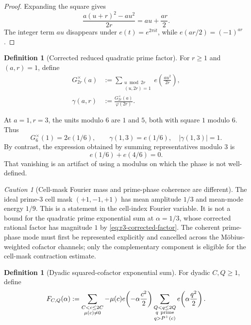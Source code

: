 \documentclass[11pt]{article}
\theoremstyle{definition}
\newtheorem{definition}[theorem]{Definition}
\theoremstyle{remark}
\newtheorem{caution}[theorem]{Caution}
\newcommand{\Pplus}{P^{+}}
\newcommand{\1}{\mathbf{1}}
\begin{document}
\begin{proof}
Expanding the square gives
\[
 \frac{a(u+r)^2-au^2}{2r}=au+\frac{ar}{2}.
\]
The integer term $au$ disappears under $e(t)=e^{2\pi i t}$, while
$e(ar/2)=(-1)^{ar}$.
\end{proof}

\begin{definition}[Corrected reduced quadratic prime factor]
\label{def:corrected-quadratic-factor}
For $r\ge1$ and $(a,r)=1$, define
\begin{align}
 G_{2r}^{\times}(a)
 &:={}
 \sum_{\substack{u\bmod 2r\\(u,2r)=1}}
 e\!\left(\frac{au^2}{2r}\right),
 \label{eq:corrected-reduced-Gauss}\\
 \gamma(a,r)
 &:={}
 \frac{G_{2r}^{\times}(a)}{\varphi(2r)}.
 \label{eq:normalized-corrected-factor}
\end{align}
\end{definition}

At $a=1,r=3$, the units modulo $6$ are $1$ and $5$, both with square $1$
modulo $6$.  Thus
\begin{equation}
 G_{6}^{\times}(1)=2e(1/6),
 \qquad
 \boxed{\gamma(1,3)=e(1/6),\quad |\gamma(1,3)|=1.}
 \label{eq:r3-corrected-factor}
\end{equation}
By contrast, the expression obtained by summing representatives modulo $3$ is
\[
 e(1/6)+e(4/6)=0.
\]
That vanishing is an artifact of using a modulus on which the phase is not
well-defined.

\begin{caution}[Cell-mask Fourier mass and prime-phase coherence are different]
\label{caution:cell-mask-vs-prime-phase}
The ideal prime-$3$ cell mask $(+1,-1,+1)$ has mean amplitude $1/3$ and mean-mode
energy $1/9$.  This is a statement in the cell-index Fourier variable.  It is not a
bound for the quadratic prime exponential sum at $\alpha=1/3$, whose corrected
rational factor has magnitude $1$ by \cref{eq:r3-corrected-factor}.  The coherent
prime-phase mode must first be represented explicitly and cancelled across the
M\"obius-weighted cofactor channels; only the complementary component is eligible
for the cell-mask contraction estimate.
\end{caution}

\begin{definition}[Dyadic squared-cofactor exponential sum]
\label{def:squared-cofactor-sum}
For dyadic $C,Q\ge1$, define
\begin{equation}
 F_{C,Q}(\alpha)
 :=
 \sum_{\substack{C<c\le2C\\\mu(c)\ne0}}
 -\mu(c)e\!\left(-\alpha\frac{c^2}{2}\right)
 \sum_{\substack{Q<q\le2Q\\q\ {\rm prime}\\q>\Pplus(c)}}
 e\!\left(\alpha\frac{q^2}{2}\right).
 \label{eq:F-CQ}
\end{equation}
\end{definition}
\end{document}
